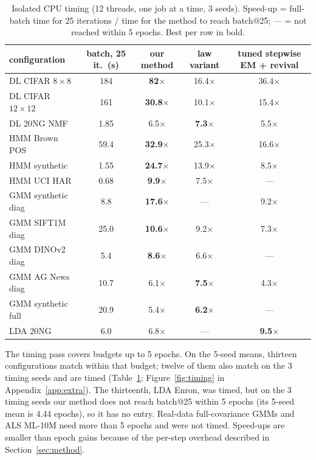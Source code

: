 \documentclass[10pt]{article}
\newcommand{\best}[1]{\textbf{#1}}
\begin{document}
\begin{table}[!htbp]
\centering\small
\caption{Isolated CPU timing (12 threads, one job at a time, 3 seeds). Speed-up = full-batch time for 25 iterations
/ time for the method to reach batch@25; --- = not reached within 5 epochs. Best per row in bold.}\label{tab:timing}
\begin{tabular}{lcccc}
\toprule
configuration & batch, 25 it.\ (s) & our method & law variant & tuned stepwise EM + revival \\
\midrule
DL CIFAR $8{\times}8$ & 184 & \best{82$\times$} & 16.4$\times$ & 36.4$\times$ \\
DL CIFAR $12{\times}12$ & 161 & \best{30.8$\times$} & 10.1$\times$ & 15.4$\times$ \\
DL 20NG NMF & 1.85 & 6.5$\times$ & \best{7.3$\times$} & 5.5$\times$ \\
HMM Brown POS & 59.4 & \best{32.9$\times$} & 25.3$\times$ & 16.6$\times$ \\
HMM synthetic & 1.55 & \best{24.7$\times$} & 13.9$\times$ & 8.5$\times$ \\
HMM UCI HAR & 0.68 & \best{9.9$\times$} & 7.5$\times$ & --- \\
GMM synthetic diag & 8.8 & \best{17.6$\times$} & --- & 9.2$\times$ \\
GMM SIFT1M diag & 25.0 & \best{10.6$\times$} & 9.2$\times$ & 7.3$\times$ \\
GMM DINOv2 diag & 5.4 & \best{8.6$\times$} & 6.6$\times$ & --- \\
GMM AG News diag & 10.7 & 6.1$\times$ & \best{7.5$\times$} & 4.3$\times$ \\
GMM synthetic full & 20.9 & 5.4$\times$ & \best{6.2$\times$} & --- \\
LDA 20NG & 6.0 & 6.8$\times$ & --- & \best{9.5$\times$} \\
\bottomrule
\end{tabular}
\end{table}

The timing pass covers budgets up to 5 epochs. On the 5-seed means, thirteen configurations match within that
budget; twelve of them also match on the 3 timing seeds and are timed (Table~\ref{tab:timing};
Figure~\ref{fig:timing} in Appendix~\ref{app:extra}). The thirteenth, LDA Enron, was timed, but on the 3 timing seeds our method does not reach
batch@25 within 5 epochs (its 5-seed mean is 4.44 epochs), so it has no entry. Real-data full-covariance GMMs and ALS
ML-10M need more than 5 epochs and were not timed. Speed-ups are smaller than epoch gains because of the per-step overhead described in
Section~\ref{sec:method}.
\end{document}
